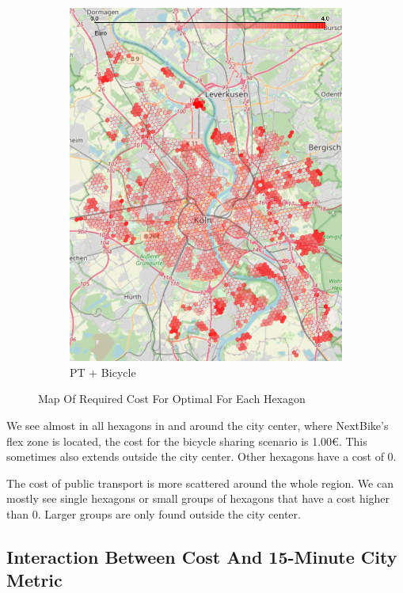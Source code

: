 \begin{figure}
\begin{subfigure}[b]{0.3\textwidth}
         \includegraphics[width=\textwidth]{Figures/results/cost/bicycle_public_transport_cost_map}
         \caption{PT + Bicycle}
         \label{fig:bicycle_public_transport_cost_map}
     \end{subfigure}
       \caption{Map Of Required Cost For Optimal For Each Hexagon}
        \label{fig:cost_map_per_scenario}
\end{figure}


We see almost in all hexagons in and around the city center, where NextBike's flex zone is located, the cost for the bicycle sharing scenario is 1.00€.
This sometimes also extends outside the city center.
Other hexagons have a cost of 0.

The cost of public transport is more scattered around the whole region. We can mostly see single hexagons or small groups of hexagons that have a cost higher than 0.
Larger groups are only found outside the city center.

\subsection{Interaction Between Cost And 15-Minute City Metric}
\label{subsec:interaction_between_cost_and_15_minute_city_metric}

